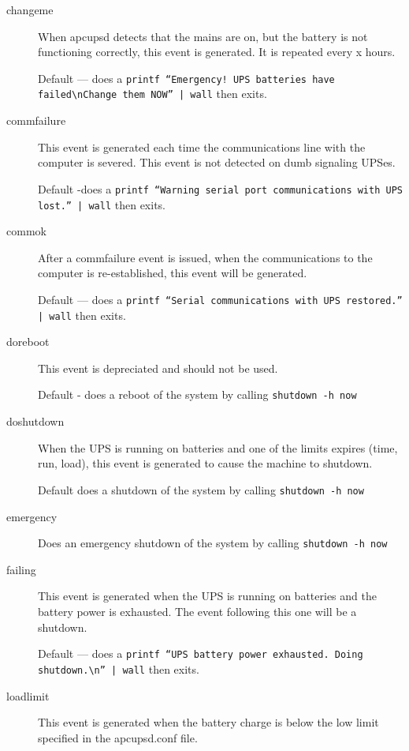 {{{{{{\begin{description}
\item [changeme]
   When apcupsd detects that the mains are on, but the battery is not functioning
correctly, this event is generated. It is repeated every x hours.  

Default {---} does a {\tt printf ``Emergency! UPS batteries have
failed\textbackslash{}nChange them NOW'' | wall} then exits.  

\item [commfailure]
   This event is generated each time the communications line with the computer is
severed. This event is not detected on dumb signaling UPSes.  

Default -does a {\tt printf ``Warning serial port communications with UPS
lost.'' | wall} then exits.  

\item [commok]
   After a commfailure event is issued, when the communications to the computer
is re-established, this event will be generated.  

Default {---} does a {\tt printf ``Serial communications with UPS restored.''
| wall} then exits.  

\item [doreboot]
   This event is depreciated and should not be used.  

Default - does a reboot of the system by calling {\tt shutdown -h now}  

\item [doshutdown]
   When the UPS is running on batteries and one of the limits expires (time, run,
load), this event is generated to cause the machine to shutdown.  

Default does a shutdown of the system by calling {\tt shutdown -h now}  

\item [emergency]
   Does an emergency shutdown of the system by calling {\tt shutdown -h now}  

\item [failing]
   This event is generated when the UPS is running on batteries and the battery
power is exhausted. The event following this one will be a shutdown.  

Default {---} does a {\tt printf ``UPS battery power exhausted. Doing
shutdown.\textbackslash{}n'' | wall} then exits.  

\item [loadlimit]
   This event is generated when the battery charge is below the low limit
specified in the apcupsd.conf file.  


\end{description}}}}}}}
